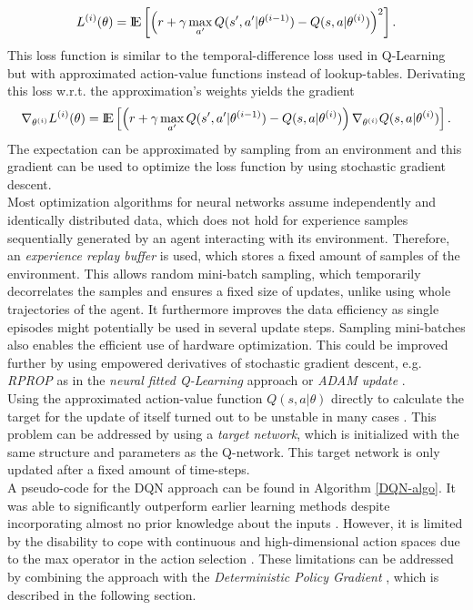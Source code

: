\[
L^{(i)}(\theta)={\rm I\!E} \left[\left(r+\gamma \max_{a'} Q(s',a'|\theta^{(i-1)})-Q(s,a|\theta^{(i)})\right)^2\right]. 
\]
This loss function is similar to the temporal-difference loss used in Q-Learning but with approximated action-value functions instead of lookup-tables. Derivating this loss w.r.t. the approximation's weights yields the gradient
\[
\nabla_{\theta^{(i)}}L^{(i)}(\theta)={\rm I\!E} \left[\left(r+\gamma \max_{a'} Q(s', 
a'|\theta^{(i-1)})-Q(s,a|\theta^{(i)})\right)\nabla_{\theta^{(i)}}Q(s,a|\theta^{(i)})\right]. 
\]
The expectation can be approximated by sampling from an environment and this gradient can be used to optimize the loss function by using stochastic gradient descent.\\
Most optimization algorithms for neural networks assume independently and identically distributed data, which does not hold for experience samples sequentially generated by an agent interacting with its environment. Therefore, an \textit{experience replay buffer} is used, which stores a fixed amount of samples of the environment. This allows random mini-batch sampling, which temporarily decorrelates the samples and ensures a fixed size of updates, unlike using whole trajectories of the agent. It furthermore improves the data efficiency as single episodes might potentially be used in several update steps. Sampling mini-batches also enables the efficient use of hardware optimization. This could be improved further by using empowered derivatives of stochastic gradient descent, e.g. \textit{RPROP} as in the \textit{neural fitted Q-Learning} approach \citep{riedmiller2005neural} or \textit{ADAM update} \citep{kingma2014adam}.\\
Using the approximated action-value function $Q(s,a|\theta)$ directly to calculate the target for the update of itself turned out to be unstable in many cases \citep{mnih2015human}. This problem can be addressed by using a \textit{target network}, which is initialized with the same structure and parameters as the Q-network. This target network is only updated after a fixed amount of time-steps.\\
A pseudo-code for the DQN approach can be found in Algorithm \ref{DQN-algo}. It was able to significantly outperform earlier learning methods despite incorporating almost no prior knowledge about the inputs \citep{mnih2013playing}. However, it is limited by the disability to cope with continuous and high-dimensional action spaces due to the max operator in the action selection \citep{lillicrap2015continuous}. These limitations can be addressed by combining the approach with the \textit{Deterministic Policy Gradient} \citep{silver2014deterministic}, which is described in the following section.

